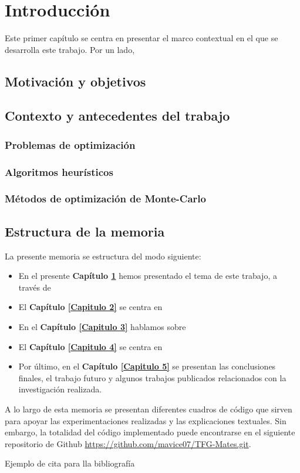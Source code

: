 \chapter{Introducción} \label{Capitulo 1}
Este primer capítulo se centra en presentar el marco contextual en el que se desarrolla este trabajo. Por un lado, 

\section{Motivación y objetivos}


\section{Contexto y antecedentes del trabajo}


\subsection{Problemas de optimización}

\subsection{Algoritmos heurísticos}

\subsection{Métodos de optimización de Monte-Carlo}



\section{Estructura de la memoria}
La presente memoria se estructura del modo siguiente:

\begin{itemize}

\item En el presente \textbf{Capítulo \ref{Capitulo 1}} hemos presentado el tema de este trabajo, a través de 

\item El \textbf{Capítulo \ref{Capitulo 2}} se centra en 

\item En el \textbf{Capítulo \ref{Capitulo 3}} hablamos sobre  

\item El \textbf{Capítulo \ref{Capitulo 4}} se centra en 

\item Por último, en el \textbf{Capítulo \ref{Capitulo 5}} se presentan las conclusiones finales, el trabajo futuro y algunos trabajos publicados relacionados con la investigación realizada.

\end{itemize}

A lo largo de esta memoria se presentan diferentes cuadros de código que sirven para apoyar las experimentaciones realizadas y las explicaciones textuales. Sin embargo, la totalidad del código implementado puede encontrarse en el siguiente repositorio de Github \url{https://github.com/mavice07/TFG-Mates.git}.

Ejemplo de cita para lla bibliografía \cite{Sanchez2022}
